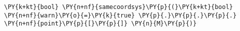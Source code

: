 \begin{Verbatim}[commandchars=\\\{\}]
    \PY{k+kt}{bool} \PY{n+nf}{samecoordsys}\PY{p}{(}\PY{k+kt}{bool} \PY{n+nf}{warn}\PY{o}{=}\PY{k}{true} \PY{p}{.}\PY{p}{.}\PY{p}{.} \PY{n+nf}{point}\PY{p}{[}\PY{p}{]} \PY{n}{M}\PY{p}{)}
\end{Verbatim}
